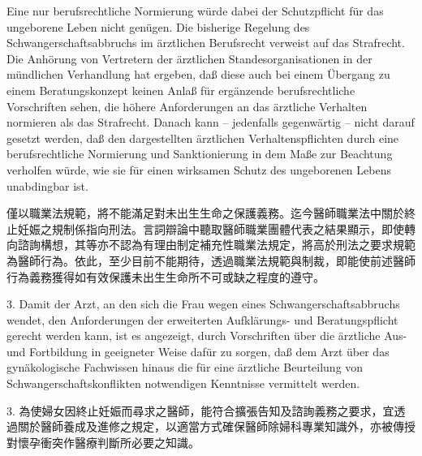 \documentclass[12pt]{article}
\begin{document}
\begin{sourcepara}[title={原文D.145}]
Eine nur berufsrechtliche Normierung würde dabei der Schutzpflicht für das ungeborene Leben nicht genügen. Die bisherige Regelung des Schwangerschaftsabbruchs im ärztlichen Berufsrecht verweist auf das Strafrecht. Die Anhörung von Vertretern der ärztlichen Standesorganisationen in der mündlichen Verhandlung hat ergeben, daß diese auch bei einem Übergang zu einem Beratungskonzept keinen Anlaß für ergänzende berufsrechtliche Vorschriften sehen, die höhere Anforderungen an das ärztliche Verhalten normieren als das Strafrecht. Danach kann -- jedenfalls gegenwärtig -- nicht darauf gesetzt werden, daß den dargestellten ärztlichen Verhaltenspflichten durch eine berufsrechtliche Normierung und Sanktionierung in dem Maße zur Beachtung verholfen würde, wie sie für einen wirksamen Schutz des ungeborenen Lebens unabdingbar ist.
\end{sourcepara}
\begin{transpara}
僅以職業法規範，將不能滿足對未出生生命之保護義務。迄今醫師職業法中關於終止妊娠之規制係指向刑法。言詞辯論中聽取醫師職業團體代表之結果顯示，即使轉向諮詢構想，其等亦不認為有理由制定補充性職業法規定，將高於刑法之要求規範為醫師行為。依此，至少目前不能期待，透過職業法規範與制裁，即能使前述醫師行為義務獲得如有效保護未出生生命所不可或缺之程度的遵守。
\end{transpara}

\begin{sourcepara}[title={原文D.146}]
3. Damit der Arzt, an den sich die Frau wegen eines Schwangerschaftsabbruchs wendet, den Anforderungen der erweiterten Aufklärungs- und Beratungspflicht gerecht werden kann, ist es angezeigt, durch Vorschriften über die ärztliche Aus- und Fortbildung in geeigneter Weise dafür zu sorgen, daß dem Arzt über das gynäkologische Fachwissen hinaus die für eine ärztliche Beurteilung von Schwangerschaftskonflikten notwendigen Kenntnisse vermittelt werden.
\end{sourcepara}
\begin{transpara}
3. 為使婦女因終止妊娠而尋求之醫師，能符合擴張告知及諮詢義務之要求，宜透過關於醫師養成及進修之規定，以適當方式確保醫師除婦科專業知識外，亦被傳授對懷孕衝突作醫療判斷所必要之知識。
\end{transpara}
\end{document}
